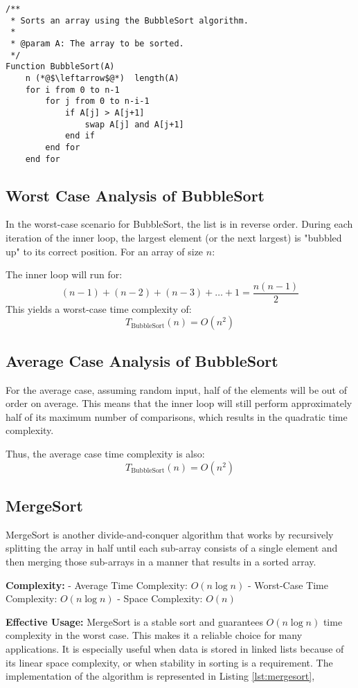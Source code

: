 \begin{lstlisting}[language=PseudoCode, label=lst:bubblesort, caption=BubbleSort Algorithm]
/**
 * Sorts an array using the BubbleSort algorithm.
 * 
 * @param A: The array to be sorted.
 */
Function BubbleSort(A)
    n (*@$\leftarrow$@*)  length(A)
    for i from 0 to n-1
        for j from 0 to n-i-1
            if A[j] > A[j+1]
                swap A[j] and A[j+1]
            end if
        end for
    end for
\end{lstlisting}

\subsection{Worst Case Analysis of BubbleSort}
In the worst-case scenario for BubbleSort, the list is in reverse order. During each iteration of the inner loop, the largest element (or the next largest) is "bubbled up" to its correct position. For an array of size \( n \):

The inner loop will run for:
\[
(n-1) + (n-2) + (n-3) + \dots + 1 = \frac{n(n-1)}{2}
\]
This yields a worst-case time complexity of:
\[
T_{\text{BubbleSort}}(n) = O(n^2)
\]

\subsection{Average Case Analysis of BubbleSort}
For the average case, assuming random input, half of the elements will be out of order on average. This means that the inner loop will still perform approximately half of its maximum number of comparisons, which results in the quadratic time complexity.

Thus, the average case time complexity is also:
\[
T_{\text{BubbleSort}}(n) = O(n^2)
\]


\subsection{MergeSort}

MergeSort is another divide-and-conquer algorithm that works by recursively splitting the array in half until each sub-array consists of a single element and then merging those sub-arrays in a manner that results in a sorted array.

\textbf{Complexity:}
- Average Time Complexity: \(O(n \log n)\)
- Worst-Case Time Complexity: \(O(n \log n)\)
- Space Complexity: \(O(n)\)

\textbf{Effective Usage:}
MergeSort is a stable sort and guarantees \(O(n \log n)\) time complexity in the worst case. This makes it a reliable choice for many applications. It is especially useful when data is stored in linked lists because of its linear space complexity, or when stability in sorting is a requirement.  The implementation of the algorithm is represented in Listing \ref{lst:mergesort},


